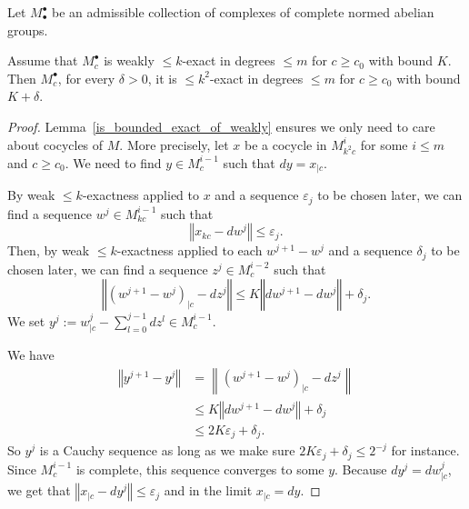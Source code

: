 \begin{lemma}
  \label{weakexact_implies_exact}
  \leanok
  Let $M^\bullet_\bullet$ be an admissible collection
  of complexes of complete normed abelian groups.

  Assume that $M^\bullet_c$ is weakly $\leq k$-exact in degrees $\leq m$ for $c\geq c_0$ with bound $K$.
  Then $M^\bullet_c$, for every $δ > 0$, it is $\leq k^2$-exact in degrees $\leq m$ for $c\geq c_0$
  with bound $K+δ$.
\end{lemma}

\begin{proof}
  \leanok
  Lemma~\ref{is_bounded_exact_of_weakly} ensures we only need to care about cocycles
  of $M$. More precisely, let $x$ be a cocycle in $M^i_{k^2c}$ for some $i ≤ m$ and $c ≥ c_0$.
  We need to find $y \in M^{i-1}_c$ such that $dy = x_{|c}$.

  By weak $\leq k$-exactness applied to $x$ and a sequence $ε_j$ to be chosen later, we can find
  a sequence $w^j \in M^{i-1}_{kc}$ such that
  \[
    ‖x_{kc} - dw^j‖ ≤ ε_j.
  \]
  Then, by weak $\leq k$-exactness applied to each $w^{j + 1} - w^j$ and a sequence $δ_j$ to be chosen later, we can find
  a sequence $z^j \in M^{i-2}_{c}$ such that
  \[
    ‖(w^{j+1} - w^j)_{|c} - dz^j‖ ≤ K‖dw^{j+1} - dw^j‖ + δ_j.
  \]
  We set $y^j := w^j_{|c} - \sum_{l=0}^{j-1} dz^l ∈ M^{i-1}_c$.


  We have
  \begin{align*}
    ‖y^{j + 1} - y^j‖ &=  \left\|(w^{j + 1} - w^j)_{|c} - dz^j\right\| \\
                      &≤  K‖dw^{j+1} - dw^j‖ + δ_j \\
                      &≤  2Kε_j + δ_j.
  \end{align*}
  So $y^j$ is a Cauchy sequence as long as we make sure $2Kε_j + δ_j ≤ 2^{-j}$ for instance.
  Since $M^{i-1}_c$ is complete, this sequence converges to some $y$.
  Because $dy^j = dw^j_{|c}$, we get that $‖x_{|c} - dy^j‖ ≤ ε_j$ and in the limit $x_{|c} = dy$.
\end{proof}

